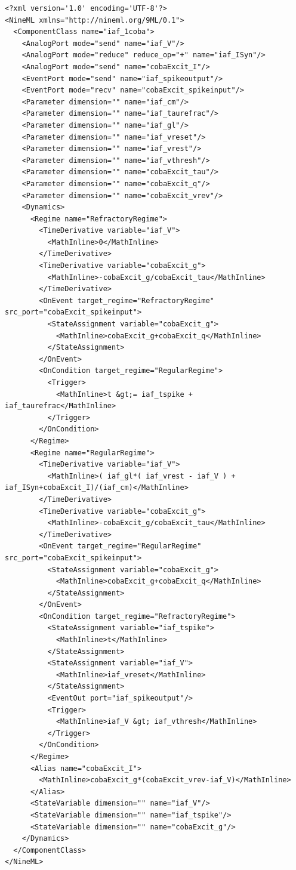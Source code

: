 \documentclass{article}
\begin{document}
\begin{lstlisting}[label=code:xmliaf2]
<?xml version='1.0' encoding='UTF-8'?>
<NineML xmlns="http://nineml.org/9ML/0.1">
  <ComponentClass name="iaf_1coba">
    <AnalogPort mode="send" name="iaf_V"/>
    <AnalogPort mode="reduce" reduce_op="+" name="iaf_ISyn"/>
    <AnalogPort mode="send" name="cobaExcit_I"/>
    <EventPort mode="send" name="iaf_spikeoutput"/>
    <EventPort mode="recv" name="cobaExcit_spikeinput"/>
    <Parameter dimension="" name="iaf_cm"/>
    <Parameter dimension="" name="iaf_taurefrac"/>
    <Parameter dimension="" name="iaf_gl"/>
    <Parameter dimension="" name="iaf_vreset"/>
    <Parameter dimension="" name="iaf_vrest"/>
    <Parameter dimension="" name="iaf_vthresh"/>
    <Parameter dimension="" name="cobaExcit_tau"/>
    <Parameter dimension="" name="cobaExcit_q"/>
    <Parameter dimension="" name="cobaExcit_vrev"/>
    <Dynamics>
      <Regime name="RefractoryRegime">
        <TimeDerivative variable="iaf_V">
          <MathInline>0</MathInline>
        </TimeDerivative>
        <TimeDerivative variable="cobaExcit_g">
          <MathInline>-cobaExcit_g/cobaExcit_tau</MathInline>
        </TimeDerivative>
        <OnEvent target_regime="RefractoryRegime" src_port="cobaExcit_spikeinput">
          <StateAssignment variable="cobaExcit_g">
            <MathInline>cobaExcit_g+cobaExcit_q</MathInline>
          </StateAssignment>
        </OnEvent>
        <OnCondition target_regime="RegularRegime">
          <Trigger>
            <MathInline>t &gt;= iaf_tspike + iaf_taurefrac</MathInline>
          </Trigger>
        </OnCondition>
      </Regime>
      <Regime name="RegularRegime">
        <TimeDerivative variable="iaf_V">
          <MathInline>( iaf_gl*( iaf_vrest - iaf_V ) + iaf_ISyn+cobaExcit_I)/(iaf_cm)</MathInline>
        </TimeDerivative>
        <TimeDerivative variable="cobaExcit_g">
          <MathInline>-cobaExcit_g/cobaExcit_tau</MathInline>
        </TimeDerivative>
        <OnEvent target_regime="RegularRegime" src_port="cobaExcit_spikeinput">
          <StateAssignment variable="cobaExcit_g">
            <MathInline>cobaExcit_g+cobaExcit_q</MathInline>
          </StateAssignment>
        </OnEvent>
        <OnCondition target_regime="RefractoryRegime">
          <StateAssignment variable="iaf_tspike">
            <MathInline>t</MathInline>
          </StateAssignment>
          <StateAssignment variable="iaf_V">
            <MathInline>iaf_vreset</MathInline>
          </StateAssignment>
          <EventOut port="iaf_spikeoutput"/>
          <Trigger>
            <MathInline>iaf_V &gt; iaf_vthresh</MathInline>
          </Trigger>
        </OnCondition>
      </Regime>
      <Alias name="cobaExcit_I">
        <MathInline>cobaExcit_g*(cobaExcit_vrev-iaf_V)</MathInline>
      </Alias>
      <StateVariable dimension="" name="iaf_V"/>
      <StateVariable dimension="" name="iaf_tspike"/>
      <StateVariable dimension="" name="cobaExcit_g"/>
    </Dynamics>
  </ComponentClass>
</NineML>

\end{lstlisting}
\end{document}
